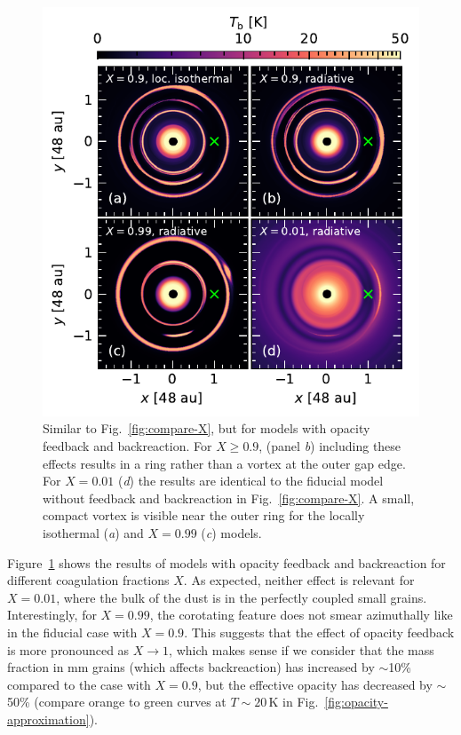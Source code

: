 \documentclass[fleqn,usenatbib,useAMS]{mnras}
\begin{document}
\begin{figure}
	\centering
	\includegraphics[width=\columnwidth]{compare-X-fo.pdf}
	\caption{Similar to Fig.~\ref{fig:compare-X}, but for models with opacity feedback and backreaction. For $X\geq0.9$, (panel \emph{b}) including these effects results in a ring rather than a vortex at the outer gap edge. For $X=0.01$ (\emph{d}) the results are identical to the fiducial model without feedback and backreaction in Fig.~\ref{fig:compare-X}. A small, compact vortex is visible near the outer ring for the locally isothermal (\emph{a}) and $X=0.99$ (\emph{c}) models.}
	\label{fig:compare-X-fo}
\end{figure}
%
Figure~\ref{fig:compare-X-fo} shows the results of models with opacity feedback and backreaction for different coagulation fractions $X$. As expected, neither effect is relevant for $X=0.01$, where the bulk of the dust is in the perfectly coupled small grains. Interestingly, for $X=0.99$, the corotating feature does not smear azimuthally like in the fiducial case with $X=0.9$. This suggests that the effect of opacity feedback is more pronounced as $X\rightarrow1$, which makes sense if we consider that the mass fraction in mm grains (which affects backreaction) has increased by $\sim$10\% compared to the case with $X=0.9$, but the effective opacity has decreased by $\sim$50\% (compare orange to green curves at $T\sim20$\,K in Fig.~\ref{fig:opacity-approximation}).
\end{document}
